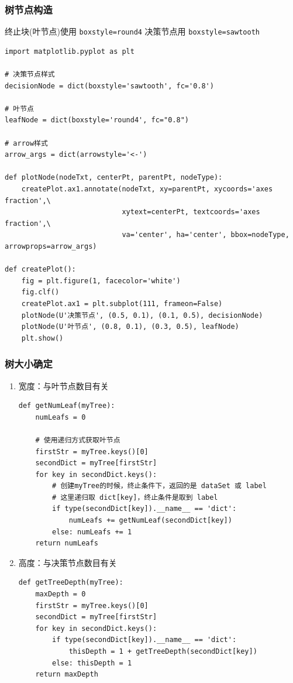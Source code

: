 \documentclass[11pt]{ctexart}
\begin{document}
\subsubsection{树节点构造}
\label{sec:orgheadline28}
终止块(叶节点)使用 \texttt{boxstyle=round4}
决策节点用 \texttt{boxstyle=sawtooth}
\lstset{language=Python,label= ,caption= ,captionpos=b,numbers=none}
\begin{lstlisting}
import matplotlib.pyplot as plt

# 决策节点样式
decisionNode = dict(boxstyle='sawtooth', fc='0.8')

# 叶节点
leafNode = dict(boxstyle='round4', fc="0.8")

# arrow样式
arrow_args = dict(arrowstyle='<-')

def plotNode(nodeTxt, centerPt, parentPt, nodeType):
    createPlot.ax1.annotate(nodeTxt, xy=parentPt, xycoords='axes fraction',\
                            xytext=centerPt, textcoords='axes fraction',\
                            va='center', ha='center', bbox=nodeType, arrowprops=arrow_args)

def createPlot():
    fig = plt.figure(1, facecolor='white')
    fig.clf()
    createPlot.ax1 = plt.subplot(111, frameon=False)
    plotNode(U'决策节点', (0.5, 0.1), (0.1, 0.5), decisionNode)
    plotNode(U'叶节点', (0.8, 0.1), (0.3, 0.5), leafNode)
    plt.show()
\end{lstlisting}
\subsubsection{树大小确定}
\label{sec:orgheadline29}
\begin{enumerate}
\item 宽度：与叶节点数目有关
\lstset{language=Python,label= ,caption= ,captionpos=b,numbers=none}
\begin{lstlisting}
def getNumLeaf(myTree):
    numLeafs = 0

    # 使用递归方式获取叶节点
    firstStr = myTree.keys()[0]
    secondDict = myTree[firstStr]
    for key in secondDict.keys():
        # 创建myTree的时候，终止条件下，返回的是 dataSet 或 label
        # 这里递归取 dict[key]，终止条件是取到 label
        if type(secondDict[key]).__name__ == 'dict':
            numLeafs += getNumLeaf(secondDict[key])
        else: numLeafs += 1
    return numLeafs
\end{lstlisting}
\item 高度：与决策节点数目有关
\lstset{language=Python,label= ,caption= ,captionpos=b,numbers=none}
\begin{lstlisting}
def getTreeDepth(myTree):
    maxDepth = 0
    firstStr = myTree.keys()[0]
    secondDict = myTree[firstStr]
    for key in secondDict.keys():
        if type(secondDict[key]).__name__ == 'dict':
            thisDepth = 1 + getTreeDepth(secondDict[key])
        else: thisDepth = 1
    return maxDepth
\end{lstlisting}
\end{enumerate}
\end{document}
